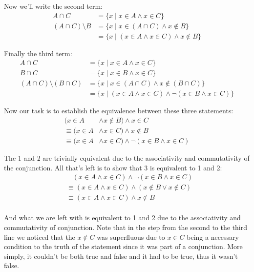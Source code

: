 \documentclass{article}
\begin{document}
Now we'll write the second term:
\begin{align*}
  A\cap C&=\{x\mid x\in A\wedge x\in C\}\\
  (A\cap C)\setminus B&=\{x\mid x\in (A\cap C) \wedge x\not\in B\}\\
  &=\{x\mid (x\in A\wedge x\in C) \wedge x\not\in B\}
\end{align*}

Finally the third term:
\begin{align*}
  A\cap C&=\{x\mid x\in A\wedge x\in C\}\\
  B\cap C&=\{x\mid x\in B\wedge x\in C\}\\
  (A\cap C)\setminus (B\cap C)&=\{x\mid x\in (A\cap C) \wedge x\not\in (B\cap C)\}\\
  &=\{x\mid (x\in A\wedge x\in C) \wedge \neg(x\in B\wedge x\in C)\}
\end{align*}

Now our task is to establish the equivalence between these three statements:
\begin{align}
  (x\in A&\wedge x\not\in B) \wedge x\in C\\
  \equiv(x\in A&\wedge x\in C) \wedge x\not\in B\\
  \equiv(x\in A&\wedge x\in C) \wedge \neg(x\in B\wedge x\in C)
\end{align}

The 1 and 2 are trivially equivalent due to the associativity and commutativity of the conjunction. All that's left is to show that 3 is equivalent to 1 and 2:
\begin{align*}
  &\ \ \ \ (x\in A\wedge x\in C) \wedge \neg(x\in B\wedge x\in C)\\
  &\equiv(x\in A\wedge x\in C) \wedge (x\not\in B\vee x\not\in C)\tag{De Morgan's law}\\
  &\equiv(x\in A\wedge x\in C) \wedge x\not\in B\tag{Law of excluded middle}\\
\end{align*}

And what we are left with is equivalent to 1 and 2 due to the associativity and commutativity of conjunction. Note that in the step from the second to the third line we noticed that the $x\not\in C$ was superfluous due to $x\in C$ being a necessary condition to the truth of the statement since it was part of a conjunction. More simply, it couldn't be both true and false and it had to be true, thus it wasn't false.
\end{document}
